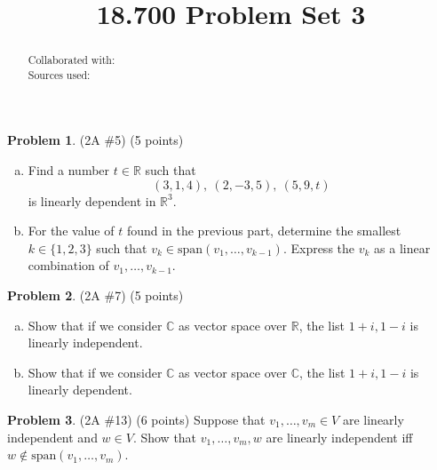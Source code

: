 \documentclass[reqno, 12pt]{amsart}
\theoremstyle{definition}
\newenvironment{problab}[1]
{\noindent\textbf{Problem #1}.}
{\vskip 6pt}
\theoremstyle{remark}
\newcommand{\C}{\mathbb C}
\newcommand{\R}{\mathbb R}
\newcommand{\SSpan}{\text{span}}
\renewcommand{\abstractname}{}    %
\begin{document}

\title{18.700 Problem Set 3}

\maketitle

\begin{abstract}
  \noindent Collaborated with:\\
  Sources used: 
\end{abstract}
\vskip 0.5cm

\begin{problab}{1} (2A \#5) (5 points)
  \begin{enumerate}[(a)]
    \item 
      Find a number $t \in \R$ such that
      \begin{equation*}
        (3,1,4),\ (2,-3,5),\ (5,9,t)
      \end{equation*}
      is linearly dependent in $\R^3$.
    \item
      For the value of $t$ found in the previous part, determine the smallest $k \in \{1,2,3\}$ such that $v_k \in \SSpan(v_1, \ldots, v_{k-1})$. Express the $v_k$ as a linear combination of $v_1, \ldots, v_{k-1}$.
  \end{enumerate}
\end{problab}

\begin{problab}{2} (2A \#7) (5 points)
  \begin{enumerate}[(a)]
    \item 
      Show that if we consider $\C$ as vector space over $\R$, the list $1+i, 1-i$ is linearly independent.
    \item
      Show that if we consider $\C$ as vector space over $\C$, the list $1+i, 1-i$ is linearly dependent.
  \end{enumerate}
\end{problab}

\begin{problab}{3} (2A \#13) (6 points)
  Suppose that $v_1, \ldots, v_m \in V$ are linearly independent and $w \in V$. Show that $v_1, \ldots, v_m, w$ are linearly independent iff $w \notin \SSpan(v_1, \ldots, v_m)$.
\end{problab}
\end{document}
